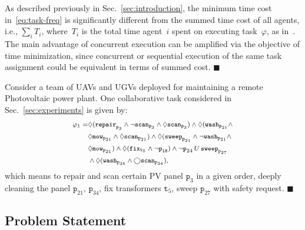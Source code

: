 \begin{remark}\label{rm:cost}
  As described previously in Sec.~\ref{sec:introduction}, the minimum time cost in~\eqref{eq:task-freq} is significantly different from the summed time cost of all agents, i.e.,
$\sum_{i} T_i$, where~$T_i$ is the total time agent~$i$ spent on executing task~$\varphi$,
as in~\citep{kantaros2020stylus, schillinger2018simultaneous, guo2016task, luo2021temporal}.
The main advantage of concurrent execution can be amplified via
the objective of time minimization,
since concurrent or sequential execution of the same task assignment could
be equivalent in terms of summed cost.
\hfill $\blacksquare$
\end{remark}
\begin{example}\label{exp:task}
Consider a team of UAVs and UGVs deployed for maintaining a remote Photovoltaic power plant.
One collaborative task considered in Sec.~\ref{sec:experiments} is given by:
\begin{equation}\footnotesize
\label{example:task}
\begin{aligned}
\varphi_1 = & \Diamond(\texttt{repair}_{\texttt{p}_{3}} \wedge \lnot \texttt{scan}_{\texttt{p}_3} \wedge\Diamond \texttt{scan}_{\texttt{p}_3})
\wedge \Diamond (\texttt{wash}_{\texttt{p}_{21}} \wedge \\
&\Diamond \texttt{mow}_{\texttt{p}_{21}} \wedge \Diamond \texttt{scan}_{\texttt{p}_{21}}) \wedge \Diamond ( \texttt{sweep}_{\texttt{p}_{21}} \wedge \lnot \texttt{wash}_{\texttt{p}_{21}} \wedge\\
& \Diamond \texttt{mow}_{\texttt{p}_{21}}) \wedge \Diamond(\texttt{fix}_{\texttt{t}_5} \wedge \lnot \texttt{p}_{\texttt{18}}) \wedge \lnot \texttt{p}_{24} \,U \, \texttt{sweep}_{\texttt{p}_{27}} \\
&\wedge \Diamond (\texttt{wash}_{\texttt{p}_{34}} \wedge \bigcirc \texttt{scan}_{\texttt{p}_{34}}),
\end{aligned}
\end{equation}
which means to repair and scan certain PV panel $\texttt{p}_3$
in a given order, deeply cleaning the panel $\texttt{p}_{21},\, \texttt{p}_{34}$, fix transformers
$\texttt{t}_5$, sweep $\texttt{p}_{27}$ with safety request.
 \hfill $\blacksquare$
\end{example}
\subsection{Problem Statement}\label{subsec:problem-statement}

